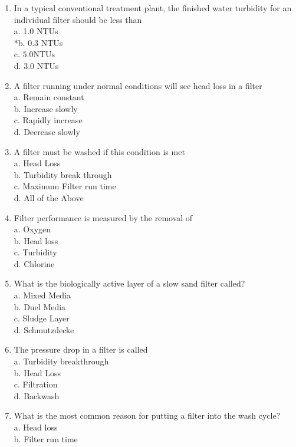 \begin{enumerate}
\item In a typical conventional treatment plant, the finished water turbidity for an individual filter should be less than\\
a. 1.0 NTUs\\
*b. 0.3 NTUs\\
c. $5.0 \mathrm{NTUs}$\\
d. 3.0 NTUs\\
\item A filter running under normal conditions will see head loss in a filter\\
a. Remain constant\\
b. Increase slowly\\
c. Rapidly increase\\
d. Decrease slowly\\
\item A filter must be washed if this condition is met\\
a. Head Loss\\
b. Turbidity break through\\
c. Maximum Filter run time\\
d. All of the Above\\
\item Filter performance is measured by the removal of\\
a. Oxygen\\
b. Head loss\\
c. Turbidity\\
d. Chlorine\\
\item What is the biologically active layer of a slow sand filter called?\\
a. Mixed Media\\
b. Duel Media\\
c. Sludge Layer\\
d. Schmutzdecke\\
\item The pressure drop in a filter is called\\
a. Turbidity breakthrough\\
b. Head Loss\\
c. Filtration\\
d. Backwash\\
\item What is the most common reason for putting a filter into the wash cycle?\\
a. Head loss\\
b. Filter run time\\

\end{enumerate}
